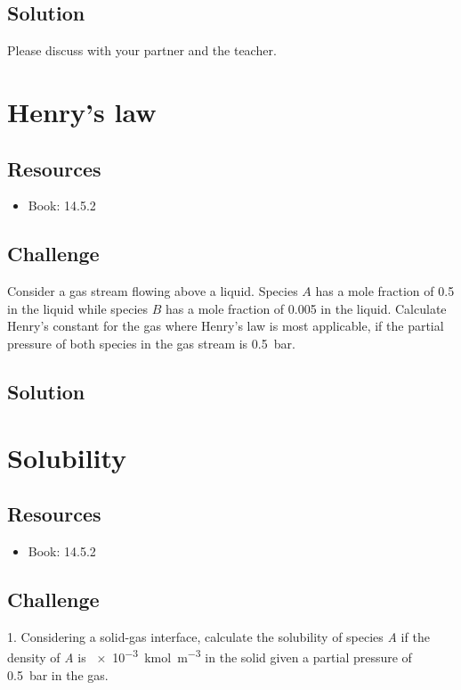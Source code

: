 \subsection*{Solution}
Please discuss with your partner and the teacher.




\newpage
\section{Henry's law}

\subsection*{Resources}
\begin{itemize}
    \item Book: 14.5.2
\end{itemize}

\subsection*{Challenge}
Consider a gas stream flowing above a liquid. Species $A$ has a mole fraction of \num{0.5} in the liquid while species $B$ has a mole fraction of \num{0.005} in the liquid. Calculate Henry's constant for the gas where Henry's law is most applicable, if the partial pressure of both species in the gas stream is \SI{0.5}{\bar}.

\subsection*{Solution}




\newpage
\section{Solubility}

\subsection*{Resources}
\begin{itemize}
    \item Book: 14.5.2
\end{itemize}

\subsection*{Challenge}
1. Considering a solid-gas interface, calculate the solubility of species \emph{A} if the density of \emph{A} is \SI{e-3}{\kmol\per\cubic\meter} in the solid given a partial pressure of \SI{0.5}{\bar} in the gas.

